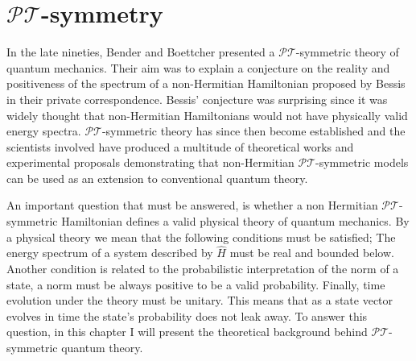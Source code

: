 \documentclass[12pt, a4paper]{report}
\newcommand\PT{\(\mathcal{PT}\)}
\begin{document}
\chapter{\texorpdfstring{$\mathcal{PT}$}\:-symmetry}\label{PT}
In the late nineties, Bender and Boettcher presented a \PT-symmetric theory of quantum mechanics. Their aim was to explain a conjecture on the reality and positiveness of the spectrum of a non-Hermitian Hamiltonian proposed by Bessis in their private correspondence\cite{RealSpectrainNHH}. Bessis' conjecture was surprising since it was widely thought that non-Hermitian Hamiltonians would not have physically valid energy spectra. 
\PT-symmetric theory has since then become established and the scientists involved have produced a multitude of theoretical works and experimental proposals demonstrating that non-Hermitian \PT-symmetric models can be used as an extension to conventional quantum theory.

An important question that must be answered, is whether a non Hermitian \PT-symmetric Hamiltonian defines a valid physical theory of quantum mechanics. By a physical theory we mean that the following conditions must be satisfied; The energy spectrum of a system described by $\hat{H}$ must be real and bounded below. Another condition is related to the probabilistic interpretation of the norm of a state, a norm must be always positive to be a valid probability. Finally, time evolution under the theory must be unitary. This means that as a state vector evolves in time the state's probability does not leak away\cite{MustaHbeHermitian,MakingSense}. To answer this question, in this chapter I will present the theoretical background behind \PT-symmetric quantum theory.  

\end{document}
